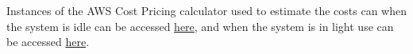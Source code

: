 \documentclass[a4paper, 11pt]{article}
\newcommand{\estimatedCostInIdleURL}{https://calculator.aws/\#/estimate?id=0f82526574f81e22825462ca5893dc9b7381e9a7}
\newcommand{\estimatedCostInUseURL}{https://calculator.aws/\#/estimate?id=33078729fb24a4066ea8e14f12bfd1392267dc69}
\begin{document}

Instances of the AWS Cost Pricing calculator used to estimate the costs can when the system is idle can be accessed \href{\estimatedCostInIdleURL}{here}, and when the system is in light use can be accessed \href{\estimatedCostInUseURL}{here}.

    
    
\end{document}
